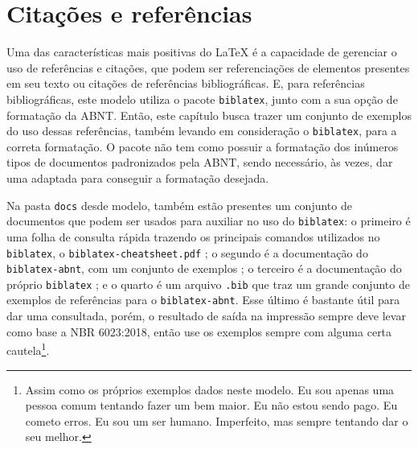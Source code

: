 \chapter{Citações e referências}
Uma das características mais positivas do \LaTeX{} é a capacidade de gerenciar o uso de referências e citações, que podem ser referenciações de elementos presentes em seu texto ou citações de referências bibliográficas. E, para referências bibliográficas\footnotemark, este modelo utiliza o pacote \verb|biblatex|, junto com a sua opção de formatação da ABNT. Então, este capítulo busca trazer um conjunto de exemplos do uso dessas referências, também levando em consideração o \verb|biblatex|, para a correta formatação. O pacote não tem como possuir a formatação dos inúmeros tipos de documentos padronizados pela ABNT, sendo necessário, às vezes, dar uma adaptada para conseguir a formatação desejada.

  Na pasta \texttt{docs} desde modelo, também estão presentes um conjunto de documentos que podem ser usados para auxiliar no uso do \texttt{biblatex}: o primeiro é uma folha de consulta rápida trazendo os principais comandos utilizados no \texttt{biblatex}, o \texttt{biblatex-cheatsheet.pdf} \cite{pdf:biblatex-cheatsheet}; o segundo é a documentação do \texttt{biblatex-abnt}, com um conjunto de exemplos \cite{pdf:biblatex-abnt}; o terceiro é a documentação do próprio \texttt{biblatex} \cite{pdf:biblatex}; e o quarto é um arquivo \texttt{.bib} que traz um grande conjunto de exemplos de referências para o \texttt{biblatex-abnt}. Esse último é bastante útil para dar uma consultada, porém, o resultado de saída na impressão sempre deve levar como base a NBR 6023:2018, então use os exemplos sempre com alguma certa cautela\footnote{Assim como os próprios exemplos dados neste modelo. Eu sou apenas uma pessoa comum tentando fazer um bem maior. Eu não estou sendo pago. Eu cometo erros. Eu sou um ser humano. Imperfeito, mas sempre tentando dar o seu melhor.}.

